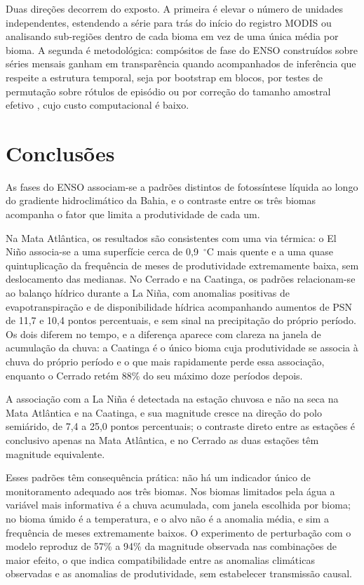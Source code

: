 \documentclass[a4paper,fleqn]{cas-sc}
\begin{document}
Duas direções decorrem do exposto. A primeira é elevar o número de unidades independentes, estendendo a série para trás do início do registro MODIS ou analisando sub-regiões dentro de cada bioma em vez de uma única média por bioma. A segunda é metodológica: compósitos de fase do ENSO construídos sobre séries mensais ganham em transparência quando acompanhados de inferência que respeite a estrutura temporal, seja por bootstrap em blocos, por testes de permutação sobre rótulos de episódio ou por correção do tamanho amostral efetivo \citep{kunsch1989, politis1994}, cujo custo computacional é baixo.

\section{Conclusões}

As fases do ENSO associam-se a padrões distintos de fotossíntese líquida ao longo do gradiente hidroclimático da Bahia, e o contraste entre os três biomas acompanha o fator que limita a produtividade de cada um.

Na Mata Atlântica, os resultados são consistentes com uma via térmica: o El Niño associa-se a uma superfície cerca de 0,9~$^{\circ}$C mais quente e a uma quase quintuplicação da frequência de meses de produtividade extremamente baixa, sem deslocamento das medianas. No Cerrado e na Caatinga, os padrões relacionam-se ao balanço hídrico durante a La Niña, com anomalias positivas de evapotranspiração e de disponibilidade hídrica acompanhando aumentos de PSN de 11,7 e 10,4 pontos percentuais, e sem sinal na precipitação do próprio período. Os dois diferem no tempo, e a diferença aparece com clareza na janela de acumulação da chuva: a Caatinga é o único bioma cuja produtividade se associa à chuva do próprio período e o que mais rapidamente perde essa associação, enquanto o Cerrado retém 88\% do seu máximo doze períodos depois.

A associação com a La Niña é detectada na estação chuvosa e não na seca na Mata Atlântica e na Caatinga, e sua magnitude cresce na direção do polo semiárido, de 7,4 a 25,0 pontos percentuais; o contraste direto entre as estações é conclusivo apenas na Mata Atlântica, e no Cerrado as duas estações têm magnitude equivalente.

Esses padrões têm consequência prática: não há um indicador único de monitoramento adequado aos três biomas. Nos biomas limitados pela água a variável mais informativa é a chuva acumulada, com janela escolhida por bioma; no bioma úmido é a temperatura, e o alvo não é a anomalia média, e sim a frequência de meses extremamente baixos. O experimento de perturbação com o modelo reproduz de 57\% a 94\% da magnitude observada nas combinações de maior efeito, o que indica compatibilidade entre as anomalias climáticas observadas e as anomalias de produtividade, sem estabelecer transmissão causal.
\end{document}
